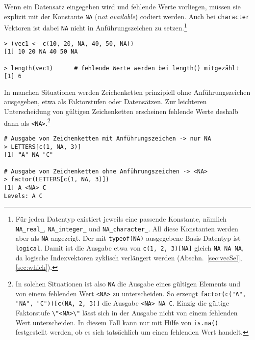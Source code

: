 Wenn ein Datensatz eingegeben wird und fehlende Werte vorliegen, müssen sie explizit mit der Konstante \lstinline!NA! (\emph{not available}) codiert werden. Auch bei \lstinline!character! Vektoren ist dabei \lstinline!NA! nicht in Anführungszeichen zu setzen.\footnote{\label{ftn:na_type}Für jeden Datentyp existiert jeweils eine passende Konstante, nämlich \lstinline!NA_real_!, \lstinline!NA_integer_! und \lstinline!NA_character_!. All diese Konstanten werden aber als \lstinline!NA! angezeigt. Der mit \lstinline!typeof(NA)! ausgegebene Basis-Datentyp ist \lstinline!logical!. Damit ist die Ausgabe etwa von \lstinline!c(1, 2, 3)[NA]! gleich \lstinline!NA NA NA!, da logische Indexvektoren zyklisch verlängert werden (Abschn.\ \ref{sec:vecSel}, \ref{sec:which}).}
\begin{lstlisting}
> (vec1 <- c(10, 20, NA, 40, 50, NA))
[1] 10 20 NA 40 50 NA

> length(vec1)      # fehlende Werte werden bei length() mitgezählt
[1] 6
\end{lstlisting}

In manchen Situationen werden Zeichenketten prinzipiell ohne Anführungszeichen ausgegeben, etwa als Faktorstufen oder Datensätzen. Zur leichteren Unterscheidung von gültigen Zeichenketten erscheinen fehlende Werte deshalb dann als \lstinline!<NA>!.\footnote{In solchen Situationen ist also \lstinline!NA! die Ausgabe eines gültigen Elements und von einem fehlenden Wert \lstinline!<NA>! zu unterscheiden. So erzeugt \lstinline!factor(c("A", "NA", "C"))[c(NA, 2, 3)]! die Ausgabe \lstinline!<NA> NA C!. Einzig die gültige Faktorstufe \lstinline!\"<NA>\"! lässt sich in der Ausgabe nicht von einem fehlenden Wert unterscheiden. In diesem Fall kann nur mit Hilfe von \lstinline!is.na()! festgestellt werden, ob es sich tatsächlich um einen fehlenden Wert handelt.}
\begin{lstlisting}
# Ausgabe von Zeichenketten mit Anführungszeichen -> nur NA
> LETTERS[c(1, NA, 3)]
[1] "A" NA "C"

# Ausgabe von Zeichenketten ohne Anführungszeichen -> <NA>
> factor(LETTERS[c(1, NA, 3)])
[1] A <NA> C
Levels: A C
\end{lstlisting}

